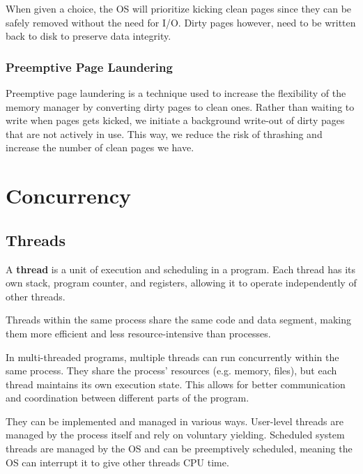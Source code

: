 \documentclass{report}
\newcommand{\definitionBegin}[1]{\begin{tcolorbox}[title={Definition: #1}]}
\newcommand{\definitionEnd}{\end{tcolorbox}}
\begin{document}
When given a choice, the OS will prioritize kicking clean pages since they can be safely removed
without the need for I/O. Dirty pages however, need to be written back to disk to preserve data integrity.





\section{Preemptive Page Laundering}
Preemptive page laundering is a technique used to increase the flexibility of the memory manager by
converting dirty pages to clean ones. Rather than waiting to write when pages gets kicked, we
initiate a background write-out of dirty pages that are not actively in use. This way, we reduce
the risk of thrashing and increase the number of clean pages we have.










\part{Concurrency}
\label{part:C}
\chapter{Threads}
\definitionBegin{Thread}
A \textbf{thread} is a unit of execution and scheduling in a program. Each thread has its own stack,
program counter, and registers, allowing it to operate independently of other threads.
\definitionEnd

Threads within the same process share the same code and data segment, making them more efficient and
less resource-intensive than processes.

In multi-threaded programs, multiple threads can run concurrently within the same process. They
share the process' resources (e.g. memory, files), but each thread maintains its own execution
state. This allows for better communication and coordination between different parts of the
program.

They can be implemented and managed in various ways. User-level threads are managed by the process
itself and rely on voluntary yielding. Scheduled system threads are managed by the OS and can be
preemptively scheduled, meaning the OS can interrupt it to give other threads CPU time.
\end{document}
